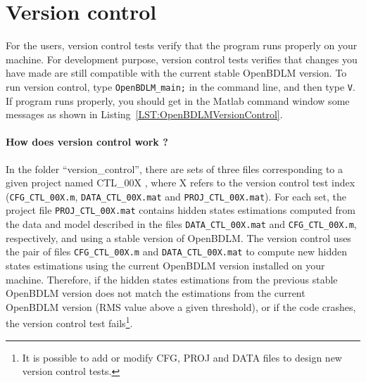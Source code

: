 \section{Version control}
\label{S:VERSIONCONTROL}

For the users, version control tests verify that the program runs properly on your machine. 
For development purpose, version control tests verifies that changes you have made are still compatible with the current stable OpenBDLM version. 
To run version control, type \colorbox{light-gray}{\lstinline[basicstyle = \mlttfamily \small, backgroundcolor = \color{light-gray}]!OpenBDLM_main;!} in the \MATLAB{} command line, and then type \colorbox{light-gray}{\lstinline[basicstyle = \mlttfamily \small, backgroundcolor = \color{light-gray}]!V!}. 
If program runs properly, you should get in the Matlab command window some messages as shown in Listing~\ref{LST:OpenBDLMVersionControl}.

\paragraph{How does version control work ?}
In the folder ``version\_control'', there are sets of three files corresponding to a given project named CTL\_00X , where X refers to the version control test index (\lstinline[basicstyle = \mlttfamily \small, backgroundcolor = \color{light-gray}]!CFG_CTL_00X.m!, \lstinline[basicstyle = \mlttfamily \small, backgroundcolor = \color{light-gray}]!DATA_CTL_00X.mat! and \lstinline[basicstyle = \mlttfamily \small, backgroundcolor = \color{light-gray}]!PROJ_CTL_00X.mat!).
For each set, the project file \lstinline[basicstyle = \mlttfamily \small, backgroundcolor = \color{light-gray}]!PROJ_CTL_00X.mat! contains hidden states estimations computed from the data and model described in the files \lstinline[basicstyle = \mlttfamily \small, backgroundcolor = \color{light-gray}]!DATA_CTL_00X.mat! and \lstinline[basicstyle = \mlttfamily \small, backgroundcolor = \color{light-gray}]!CFG_CTL_00X.m!, respectively, and using a stable version of OpenBDLM.
The version control uses the pair of files \lstinline[basicstyle = \mlttfamily \small, backgroundcolor = \color{light-gray}]!CFG_CTL_00X.m! and \lstinline[basicstyle = \mlttfamily \small, backgroundcolor = \color{light-gray}]!DATA_CTL_00X.mat! to compute new hidden states estimations using the current  OpenBDLM version installed on your machine.
Therefore, if the hidden states estimations from the previous stable OpenBDLM version does not match the estimations from the current OpenBDLM version (RMS value above a given threshold), or if the code crashes, the version control test fails\footnote{It is possible to add or modify CFG, PROJ and DATA files to design new version control tests.}.

